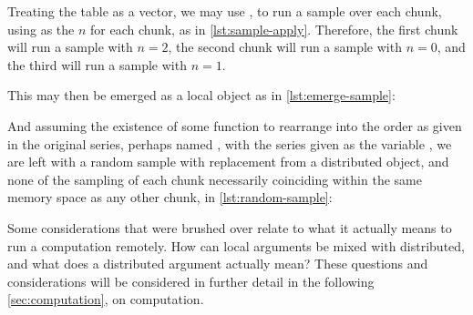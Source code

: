 
Treating the table as a vector, we may use , to run
a sample over each chunk, using  as the \(n\) for
each chunk, as in \cref{lst:sample-apply}. Therefore, the first chunk will run a sample with \(n=2\),
the second chunk will run a sample with \(n=0\), and the third will run
a sample with \(n=1\).


This may then be emerged as a local object as in \cref{lst:emerge-sample}:


And assuming the existence of some function to rearrange into the order
as given in the original series, perhaps named , with
the series given as the variable , we are left with a
random sample with replacement from a distributed object, and none of
the sampling of each chunk necessarily coinciding within the same memory
space as any other chunk, in \cref{lst:random-sample}:


Some considerations that were brushed over relate to what it actually
means to run a computation remotely. How can local arguments be mixed
with distributed, and what does a distributed argument actually mean?
These questions and considerations will be considered in further detail
in the following \cref{sec:computation}, on computation.
